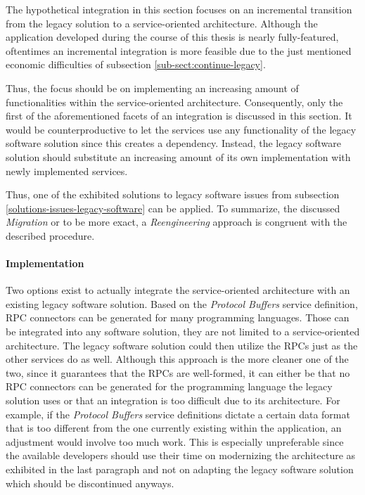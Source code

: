 \documentclass[12pt,a4paper,twoside]{report}
\begin{document}
The hypothetical integration in this section focuses on an incremental transition
from the legacy solution to a service-oriented architecture.
Although the application developed during the course of this thesis is nearly
fully-featured, oftentimes an incremental integration is more feasible due to
the just mentioned economic difficulties of subsection \ref{sub-sect:continue-legacy}.

Thus, the focus should be on implementing an increasing amount of functionalities
within the service-oriented architecture. Consequently, only the first of the
aforementioned facets of an integration is discussed in this section.
It would be counterproductive to let the services use any functionality of the
legacy software solution since this creates a dependency.
Instead, the legacy software solution should substitute an increasing amount
of its own implementation with newly implemented services.

Thus, one of the exhibited solutions to legacy software issues from subsection
\ref{solutions-issues-legacy-software} can be applied.
To summarize, the discussed \textit{Migration} or to be more exact,
a \textit{Reengineering} approach is congruent with the described procedure.

\paragraph{Implementation}
Two options exist to actually integrate the service-oriented architecture
with an existing legacy software solution.
Based on the \textit{Protocol Buffers} service definition, RPC connectors can
be generated for many programming languages. Those can be integrated into any
software solution, they are not limited to a service-oriented architecture.
The legacy software solution could then utilize the RPCs just as the other
services do as well. Although this approach is the more cleaner one of the two,
since it guarantees that the RPCs are well-formed, it can either be
that no RPC connectors can be generated for the programming language the
legacy solution uses or that an integration is too difficult due to its
architecture. For example, if the \textit{Protocol Buffers} service definitions
dictate a certain data format that is too different from the one currently
existing within the application, an adjustment would involve too much work.
This is especially unpreferable since the available developers should use their
time on modernizing the architecture as exhibited in the last paragraph and
not on adapting the legacy software solution which should be discontinued anyways.
\end{document}
